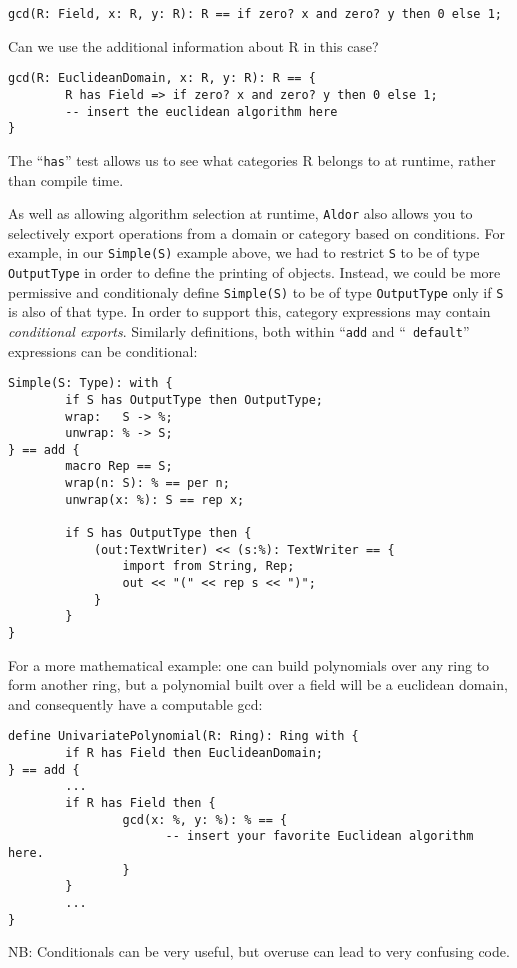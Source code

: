 \documentclass{article}
\newcommand{\Aldor}{{\tt Aldor}}
\begin{document}
\begin{small}
\begin{verbatim}
gcd(R: Field, x: R, y: R): R == if zero? x and zero? y then 0 else 1;
\end{verbatim}
\end{small}

Can we use the additional information about R in this case?

\begin{small}
\begin{verbatim}
gcd(R: EuclideanDomain, x: R, y: R): R == {
        R has Field => if zero? x and zero? y then 0 else 1;
        -- insert the euclidean algorithm here
}
\end{verbatim}
\end{small}
The ``{\tt has}'' test allows us to see what categories R belongs to at
runtime, rather than compile time.

As well as allowing algorithm selection at runtime, \Aldor{} also
allows you to selectively export operations from a domain or category
based on conditions.
For example, in our {\tt Simple(S)} example above, we had to restrict
{\tt S} to be of type {\tt OutputType} in order to define the printing
of objects. Instead, we could be more permissive and conditionaly define
{\tt Simple(S)} to be of type {\tt OutputType} only if {\tt S} is also
of that type.
In order to support this, category expressions may contain {\em conditional
exports}. Similarly definitions, both within ``{\tt add} and ``{\tt
default}'' expressions can be conditional:
\begin{small}
\begin{verbatim}
Simple(S: Type): with {
        if S has OutputType then OutputType;
        wrap:   S -> %;
        unwrap: % -> S;
} == add {
        macro Rep == S;
        wrap(n: S): % == per n;
        unwrap(x: %): S == rep x;

        if S has OutputType then {
            (out:TextWriter) << (s:%): TextWriter == {
                import from String, Rep;
                out << "(" << rep s << ")";
            }
        }
}
\end{verbatim}
\end{small}

For a more mathematical example: one can build polynomials over any
ring to form another ring, but a polynomial built over a field will be
a euclidean domain, and consequently have a computable gcd:
\begin{small}
\begin{verbatim}
define UnivariatePolynomial(R: Ring): Ring with {
        if R has Field then EuclideanDomain;
} == add {
        ...
        if R has Field then {
                gcd(x: %, y: %): % == {
                      -- insert your favorite Euclidean algorithm here.
                }
        }
        ...
}
\end{verbatim}
\end{small}
NB: Conditionals can be very useful, but overuse can lead to very
confusing code.  
\end{document}
